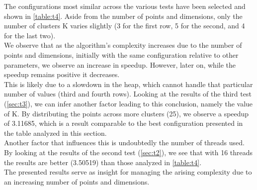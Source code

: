 \documentclass[10pt,twocolumn,letterpaper]{article}
\begin{document}
The configurations most similar across the various tests have been selected and shown in \cref{table:t4}. Aside from the number of points and dimensions, only the number of clusters K varies slightly (3 for the first row, 5 for the second, and 4 for the last two).\\
We observe that as the algorithm's complexity increases due to the number of points and dimensions, initially with the same configuration relative to other parameters, we observe an increase in speedup. However, later on, while the speedup remains positive it decreases.\\
This is likely due to a slowdown in the heap, which cannot handle that particular number of values (third and fourth rows). Looking at the results of the third test (\cref{sec:t3}), we can infer another factor leading to this conclusion, namely the value of K. By distributing the points across more clusters (25), we observe a speedup of 3.11685, which is a result comparable to the best configuration presented in the table analyzed in this section.\\
Another factor that influences this is undoubtedly the number of threads used. By looking at the results of the second test (\cref{sec:t2}), we see that with 16 threads the results are better (3.50519) than those analyzed in \cref{table:t4}.\\
The presented results serve as insight for managing the arising complexity due to an increasing number of points and dimensions.
\end{document}
